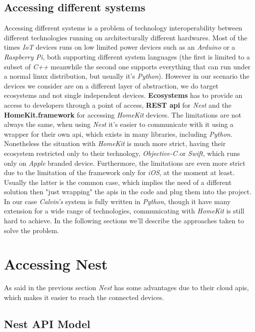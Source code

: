 \subsection{Accessing different systems}

Accessing different systems is a problem of technology interoperability between
different technologies running on architecturally different hardwares.
Most of the times \textit{IoT} devices runs on low limited power devices such as
an \textit{Arduino} or a \textit{Raspberry Pi}, both supporting different system
languages (the first is limited to a subset of \textit{C++} meanwhile the second one supports everything
that can run under a normal linux distribution, but usually it's \textit{Python}).
However in our scenario the devices we consider are on a different layer of abstraction,
we do target ecosystems and not single independent devices. \textbf{Ecosystems} has to
provide an access to developers through a point of access, \textbf{REST api} for   \textit{Nest}
and the \textbf{HomeKit.framework} for accessing \textit{HomeKit} devices.
The limitations are not always the same, when using \textit{Nest} it's easier to communicate
with it using a wrapper for their own api, which exists in many libraries, including \textit{Python}.
Nonetheless the situation with \textit{HomeKit} is much more strict, having their ecosystem
restricted only to their technology, \textit{Objective-C} or \textit{Swift}, which runs only
on \textit{Apple} branded device. Furthermore, the limitations are even more strict
due to the limitation of the framework only for \textit{iOS}, at the moment at least.
Usually the latter is the common case, which implies the need of a different solution
then "just wrapping" the apis in the code and plug them into the project.
In our case \textit{Calvin's} system is fully written in \textit{Python},
though it have many extension for a wide range of technologies, communicating
with \textit{HomeKit} is still hard to achieve.
In the following sections we'll describe the approaches taken to solve
the problem.


\section{Accessing Nest}

As said in the previous section \textit{Nest} has some advantages
due to their cloud apis, which makes it easier to reach the connected devices.

\subsection{Nest API Model}

